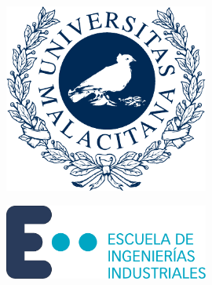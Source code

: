 
\begin{titlepage}

\newcommand{\HRule}{\rule{\linewidth}{0.5mm}} %

\begin{center} %
 

\begin{figure}[h]
\begin{minipage}{0.3\linewidth}
	\centering
		\includegraphics[width=0.6\textwidth]{Images/logo_uma.pdf}
	\label{fig:logouma}
	\end{minipage}
	\hspace{5cm}
	\begin{minipage}{0.5\linewidth}
	\centering
		\includegraphics[width=0.6\textwidth]{Images/logo_eii.pdf}
	\label{fig:logoetsii}
	\end{minipage}
\end{figure}
 




\end{center}
\end{titlepage}
